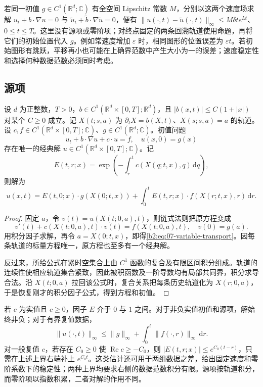 若同一初值 \(g\in C^1(\mathbb R^d;\mathbb C)\) 有全空间 Lipschitz 常数 \(M\)，分别以这两个速度场求解 \(u_t+b\cdot\nabla u=0\) 与 \(\widetilde u_t+\widetilde b\cdot\nabla\widetilde u=0\)，便有 \(\|u(\cdot,t)-\widetilde u(\cdot,t)\|_\infty\leq M\delta t e^{Lt}\)、\(0\leq t\leq T\)。这里没有源项或零阶项；对终点固定的两条回溯轨道使用命题，再将它们的初始位置代入 \(g\)。例如常速度增加 \(\varepsilon\) 时，相同图形的位置误差为 \(\varepsilon t\)。若初始图形有跳跃，平移再小也可能在上确界范数中产生大小为一的误差；速度稳定性和选择何种数据范数必须同时考虑。

\subsection{源项}
\label{b2:subsec:070302}

\begin{theorem}\label{b2:thm:07-variable-transport}
设 \(d\) 为正整数，\(T>0\)，\(b\in C^1(\mathbb R^d\times[0,T];\mathbb R^d)\)，且 \(|b(x,t)|\leq C(1+|x|)\) 对某个 \(C\geq0\) 成立。记 \(X(t;s,a)\) 为 \(\partial_tX=b(X,t)\)、\(X(s;s,a)=a\) 的轨道。设 \(c,f\in C^1(\mathbb R^d\times[0,T];\mathbb C)\)、\(g\in C^1(\mathbb R^d;\mathbb C)\)。初值问题
\[
 u_t+b\cdot\nabla u+c\cdot u=f,\quad u(x,0)=g(x)
\]
存在唯一的经典解 \(u\in C^1(\mathbb R^d\times[0,T];\mathbb C)\)。记
\[
 E(t,r;x)=\exp\left(-\int_r^t c(X(q;t,x),q)\,\mathrm dq\right),
\]
则解为
\begin{equation}\label{b2:eq:07-variable-transport}
 u(x,t)=E(t,0;x)\cdot g(X(0;t,x))
 +\int_0^tE(t,r;x)\cdot f(X(r;t,x),r)\,\mathrm dr.
\end{equation}
\end{theorem}
\begin{proof}
固定 \(a\)，令 \(v(t)=u(X(t;0,a),t)\)，则链式法则把原方程变成
\[
 v'(t)+c(X(t;0,a),t)\cdot v(t)=f(X(t;0,a),t),\quad v(0)=g(a).
\]
用积分因子求解，再令 \(a=X(0;t,x)\)，即得\eqref{b2:eq:07-variable-transport}。因每条轨道的标量方程唯一，原方程也至多有一个经典解。

反过来，所给公式在紧时空集合上由 \(C^1\) 函数的复合及有限区间积分组成。轨道的连续性使相应轨道集合紧致，因此被积函数及一阶导数均有局部共同界，积分求导合法。沿 \(X(t;0,a)\) 拉回该公式时，复合关系把每条历史轨道化为 \(X(r;0,a)\)，于是恢复刚才的积分因子公式，得到方程和初值。
\end{proof}

若 \(c\) 为实值且 \(c\geq0\)，因子 \(E\) 介于 \(0\) 与 \(1\) 之间。对于非负实值初值和源项，解始终非负；对于有界复值数据，
\[
 \|u(\cdot,t)\|_\infty\leq\|g\|_\infty
 +\int_0^t\|f(\cdot,r)\|_\infty\,\mathrm dr.
\]
对一般复值 \(c\)，若存在 \(C_0\geq0\) 使 \(\operatorname{Re}c\geq-C_0\)，则 \(|E(t,r;x)|\leq e^{C_0(t-r)}\)，只需在上述上界右端补上 \(e^{C_0t}\)。这类估计还可用于两组数据之差，给出固定速度和零阶系数下的稳定性；两种上界均要求右侧的数据范数积分有限。源项按轨道积分，而零阶项以指数积累，二者对解的作用不同。

